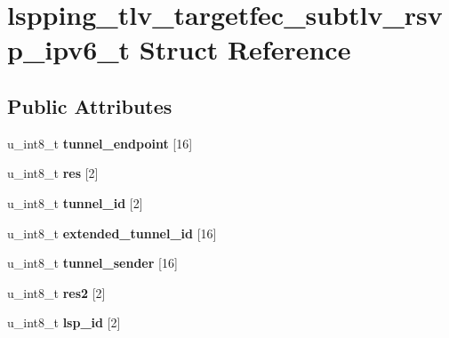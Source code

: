 \hypertarget{structlspping__tlv__targetfec__subtlv__rsvp__ipv6__t}{
\section{lspping\_\-tlv\_\-targetfec\_\-subtlv\_\-rsvp\_\-ipv6\_\-t Struct Reference}
\label{structlspping__tlv__targetfec__subtlv__rsvp__ipv6__t}
}
\subsection*{Public Attributes}
\begin{DoxyCompactItemize}
\item 
\hypertarget{structlspping__tlv__targetfec__subtlv__rsvp__ipv6__t_ae52ffc4d8e31e5005739c67fa531e38a}{
u\_\-int8\_\-t {\bfseries tunnel\_\-endpoint} \mbox{[}16\mbox{]}}
\label{structlspping__tlv__targetfec__subtlv__rsvp__ipv6__t_ae52ffc4d8e31e5005739c67fa531e38a}

\item 
\hypertarget{structlspping__tlv__targetfec__subtlv__rsvp__ipv6__t_aee9685588f1932ee0f2e2f2c6d60d902}{
u\_\-int8\_\-t {\bfseries res} \mbox{[}2\mbox{]}}
\label{structlspping__tlv__targetfec__subtlv__rsvp__ipv6__t_aee9685588f1932ee0f2e2f2c6d60d902}

\item 
\hypertarget{structlspping__tlv__targetfec__subtlv__rsvp__ipv6__t_a48b19dcd77dd0ec9ffcadb297b2ff7bf}{
u\_\-int8\_\-t {\bfseries tunnel\_\-id} \mbox{[}2\mbox{]}}
\label{structlspping__tlv__targetfec__subtlv__rsvp__ipv6__t_a48b19dcd77dd0ec9ffcadb297b2ff7bf}

\item 
\hypertarget{structlspping__tlv__targetfec__subtlv__rsvp__ipv6__t_a66108d746b4a605e24f85c3dd72ffb58}{
u\_\-int8\_\-t {\bfseries extended\_\-tunnel\_\-id} \mbox{[}16\mbox{]}}
\label{structlspping__tlv__targetfec__subtlv__rsvp__ipv6__t_a66108d746b4a605e24f85c3dd72ffb58}

\item 
\hypertarget{structlspping__tlv__targetfec__subtlv__rsvp__ipv6__t_a67d07943feaa358fe3edbec846488957}{
u\_\-int8\_\-t {\bfseries tunnel\_\-sender} \mbox{[}16\mbox{]}}
\label{structlspping__tlv__targetfec__subtlv__rsvp__ipv6__t_a67d07943feaa358fe3edbec846488957}

\item 
\hypertarget{structlspping__tlv__targetfec__subtlv__rsvp__ipv6__t_a17fc32a88bbad0346b651b8c7b28b16c}{
u\_\-int8\_\-t {\bfseries res2} \mbox{[}2\mbox{]}}
\label{structlspping__tlv__targetfec__subtlv__rsvp__ipv6__t_a17fc32a88bbad0346b651b8c7b28b16c}

\item 
\hypertarget{structlspping__tlv__targetfec__subtlv__rsvp__ipv6__t_aec75bb5cb5cbbed7a27d2516369492e7}{
u\_\-int8\_\-t {\bfseries lsp\_\-id} \mbox{[}2\mbox{]}}
\label{structlspping__tlv__targetfec__subtlv__rsvp__ipv6__t_aec75bb5cb5cbbed7a27d2516369492e7}

\end{DoxyCompactItemize}



